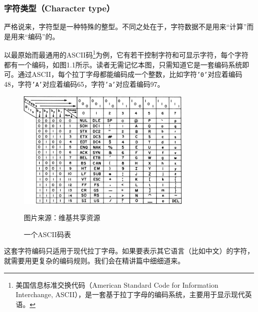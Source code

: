 \subsubsection*{字符类型（Character type）}
严格说来，字符型是一种特殊的整型。不同之处在于，字符数据不是用来``计算''而是用来``编码''的。\par
以最原始而最通用的ASCII码\footnote{美国信息标准交换代码（American Standard Code for Information Interchange, ASCII），是一套基于拉丁字母的编码系统，主要用于显示现代英语。}为例，它有若干控制字符和可显示字符，每个字符都有一个编码，如图1.1所示。读者无需记忆本图，只需知道它是一套编码系统即可。通过ASCII，每个拉丁字母都能编码成一个整数，比如字符\texttt{'0'}对应着编码48，字符\texttt{'A'}对应着编码65，字符\texttt{'a'}对应着编码97。\par
\begin{figure}[htbp]
    \centering
    \includegraphics[width=0.75\textwidth]{../images/generalized_parts/01_ASCII.png}
    \caption{一个ASCII码表}
    \footnotesize{图片来源：维基共享资源}
\end{figure}
这套字符编码只适用于现代拉丁字母。如果要表示其它语言（比如中文）的字符，就需要用更复杂的编码规则。我们会在精讲篇中细细道来。\par
